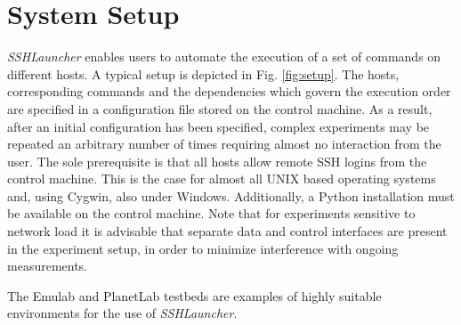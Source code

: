 \chapter{System Setup}

\emph{SSHLauncher} enables users to automate the execution of a set of commands on different hosts. A typical setup is depicted in Fig. \ref{fig:setup}. The hosts, corresponding commands and the dependencies which govern the execution order are specified in a configuration file stored on the control machine. As a result, after an initial configuration has been specified, complex experiments may be repeated an arbitrary number of times requiring almost no interaction from the user. The sole prerequisite is that all hosts allow remote SSH logins from the control machine. This is the case for almost all UNIX based operating systems and, using Cygwin, also under Windows. Additionally, a Python installation must be available on the control machine. Note that for experiments sensitive to network load it is advisable that separate data and control interfaces are present in the experiment setup, in order to minimize interference with ongoing measurements.

The Emulab \cite{Whiteosdi02} and PlanetLab \cite{956995} testbeds are examples of highly suitable environments for the use of \emph{SSHLauncher}.

